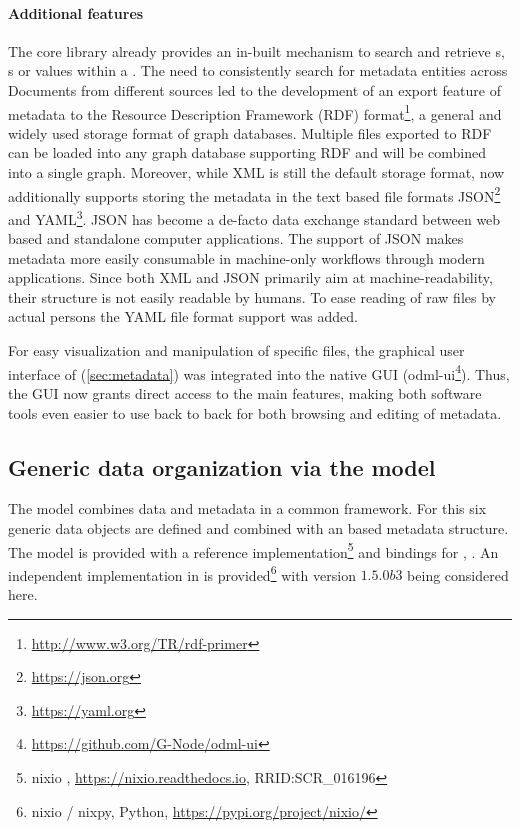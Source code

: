 \paragraph{Additional features}
The  core library already provides an in-built mechanism to search and retrieve s, s or values within a . The need to consistently search for metadata entities across Documents from different sources led to the development of an export feature of  metadata to the Resource Description Framework (RDF) format\footnote{\url{http://www.w3.org/TR/rdf-primer}}, a general and widely used storage format of graph databases. Multiple  files exported to RDF can be loaded into any graph database supporting RDF and will be combined into a single graph. Moreover, while XML is still the default storage format,  now additionally supports storing the metadata in the text based file formats JSON\footnote{\url{https://json.org}} and YAML\footnote{\url{https://yaml.org}}. JSON has become a de-facto data exchange standard between web based and standalone computer applications. The support of JSON makes  metadata more easily consumable in machine-only workflows through modern applications. Since both XML and JSON primarily aim at machine-readability, their structure is not easily readable by humans. To ease reading of raw  files by actual persons the YAML file format support was added.

For easy visualization and manipulation of specific  files, the graphical user interface of  (\cref{sec:metadata}) was integrated into the native  GUI (odml-ui\footnote{\url{https://github.com/G-Node/odml-ui}}). Thus, the  GUI now grants direct access to the main  features, making both software tools even easier to use back to back for both browsing and editing of metadata.


\subsection{Generic data organization via the  model}
The  model combines data and metadata in a common framework. For this six generic data objects are defined and combined with an  based metadata structure. The  model is provided with a  reference implementation\footnote{nixio , \url{https://nixio.readthedocs.io},  RRID:SCR\_016196} and bindings for , . An independent implementation in  is provided\footnote{nixio / nixpy, Python, \url{https://pypi.org/project/nixio/}} with version $1.5.0b3$ being considered here.

